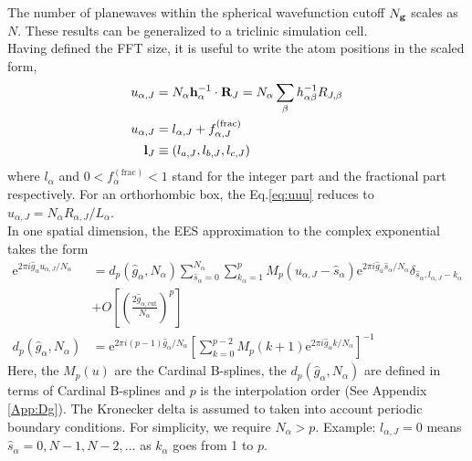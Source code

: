 \documentclass[paper=a4, fontsize=11pt]{article} %
\numberwithin{equation}{section} %
\numberwithin{figure}{section} %
\numberwithin{table}{section} %
\newcommand{\bh}{{\bf{h}}}
\newcommand{\bl}{{\bf{l}}}
\newcommand{\bg}{{\bf{g}}}
\newcommand{\bR}{{\bf{R}}}
\newcommand{\re}{{\mathrm{e}}}
\newcommand{\al}{{\alpha}}
\begin{document}
The number of planewaves within the spherical wavefunction cutoff $N_\bg$ scales as $N$. These results can be generalized to a triclinic simulation cell.\\

Having defined the FFT size, it is useful to write the atom positions in the scaled form, 
\begin{equation}\label{eq:uuu}
\begin{split}
u_{\al,J} &= N_\al \bh_\al^{-1}\cdot \bR_J = N_\al \sum_\beta h_{\al\beta}^{-1}R_{J,\beta}\\
u_{\al,J} &= l_{\al,J} + f^{(\mathrm{frac})}_{\al,J} \\
\bl_J &\equiv (l_{a,J},l_{b,J},l_{c,J}) \\
\end{split}
\end{equation}
where $l_\al$ and $0 < f^{(\mathrm{frac})}_\al < 1$ stand for the integer part and the fractional part respectively. For an orthorhombic box, the Eq.\eqref{eq:uuu} reduces to $u_{\al,J} = N_\al R_{\al,J}/L_\al$.\\

In one spatial dimension, the EES approximation to the complex exponential takes the form
\begin{equation} \label{eq:finite}
\begin{split}
\re^{2\pi i\hat{g}_{\alpha}u_{\alpha,J}/N_\alpha}
 & = d_p(\hat{g}_{\alpha},N_\alpha)\sum_{\hat s_\alpha=0}^{N_\al} \sum_{k_\al=1}^p M_p(u_{\alpha,J}-\hat s_{\al})\re^{2\pi i\hat{g}_{\alpha}\hat s_{\alpha}/N_\alpha} \delta_{\hat s_\al,l_{\al,J}-k_\al} \\
 &+ O\left[\left(\frac{2 \hat g_{\al,\mathrm{cut}}}{N_\al}\right)^p\right] \\
d_p(\hat{g}_{\alpha},N_\alpha) &= \re^{2\pi i (p-1) \hat{g}_\al/N_\al}\left[\sum_{k=0}^{p-2}M_p(k+1)\re^{2\pi i\hat{g}_\al k/N_\al }\right]^{-1}
\end{split}
\end{equation}
Here, the $M_p(u)$ are the Cardinal B-splines, the $d_p(\hat{g}_{\alpha},N_\alpha)$ are defined in terms of Cardinal B-splines and $p$ is the interpolation order (See Appendix \ref{App:Dg}). The Kronecker delta is assumed to taken into account periodic boundary conditions. For simplicity, we require $N_\al > p$. Example: $l_{\al,J}=0$ means $\hat s_\al = 0,N-1,N-2,...$ as $k_\al$ goes from 1 to $p$. \\
\end{document}
